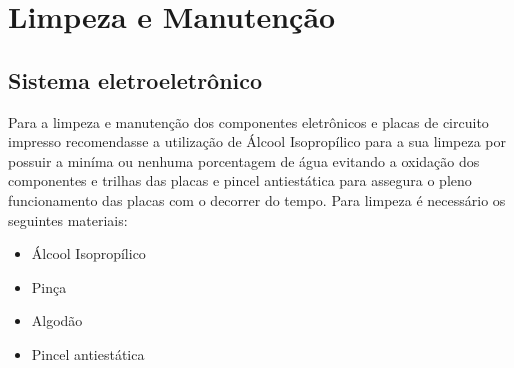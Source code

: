 \chapter{Limpeza e Manutenção}

\section*{Sistema eletroeletrônico}
\par Para a limpeza e manutenção dos componentes eletrônicos e placas de circuito impresso recomendasse a utilização de Álcool Isopropílico para a sua limpeza por possuir a miníma ou nenhuma porcentagem de água evitando a oxidação dos componentes e trilhas das placas e pincel antiestática para assegura o pleno funcionamento das placas com o decorrer do tempo. Para limpeza é necessário os seguintes materiais: 
\begin{itemize}
    \item Álcool Isopropílico
    \item Pinça
    \item Algodão
    \item Pincel antiestática
\end{itemize}

